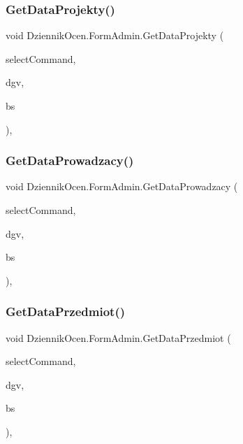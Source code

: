 \subsubsection{\texorpdfstring{Get\+Data\+Projekty()}{GetDataProjekty()}}
{\footnotesize\ttfamily void Dziennik\+Ocen.\+Form\+Admin.\+Get\+Data\+Projekty (\begin{DoxyParamCaption}\item[{string}]{select\+Command,  }\item[{Data\+Grid\+View}]{dgv,  }\item[{Binding\+Source}]{bs }\end{DoxyParamCaption})\hspace{0.3cm}{\ttfamily [inline]}, {\ttfamily [private]}}

\mbox{\label{class_dziennik_ocen_1_1_form_admin_af98b8f3bf331570a6d1215b13cf054ef}} 
\subsubsection{\texorpdfstring{Get\+Data\+Prowadzacy()}{GetDataProwadzacy()}}
{\footnotesize\ttfamily void Dziennik\+Ocen.\+Form\+Admin.\+Get\+Data\+Prowadzacy (\begin{DoxyParamCaption}\item[{string}]{select\+Command,  }\item[{Data\+Grid\+View}]{dgv,  }\item[{Binding\+Source}]{bs }\end{DoxyParamCaption})\hspace{0.3cm}{\ttfamily [inline]}, {\ttfamily [private]}}

\mbox{\label{class_dziennik_ocen_1_1_form_admin_a1d5c0be82fed48ef5de771ecce613e0b}} 
\subsubsection{\texorpdfstring{Get\+Data\+Przedmiot()}{GetDataPrzedmiot()}}
{\footnotesize\ttfamily void Dziennik\+Ocen.\+Form\+Admin.\+Get\+Data\+Przedmiot (\begin{DoxyParamCaption}\item[{string}]{select\+Command,  }\item[{Data\+Grid\+View}]{dgv,  }\item[{Binding\+Source}]{bs }\end{DoxyParamCaption})\hspace{0.3cm}{\ttfamily [inline]}, {\ttfamily [private]}}

